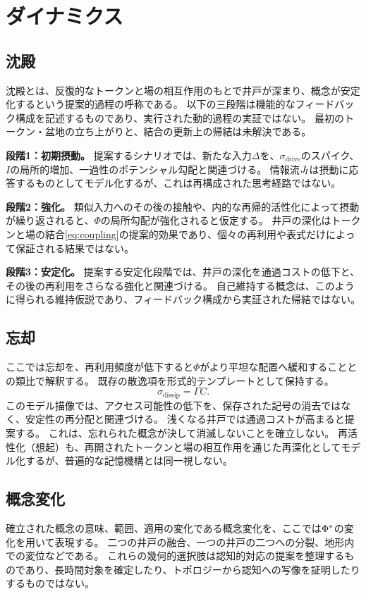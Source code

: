 \section{ダイナミクス}
\label{sec:dynamics}

\subsection{沈殿}
沈殿とは、反復的なトークンと場の相互作用のもとで井戸が深まり、概念が安定化するという提案的過程の呼称である。
以下の三段階は機能的なフィードバック構成を記述するものであり、実行された動的過程の実証ではない。
最初のトークン・盆地の立ち上がりと、結合の更新上の帰結は未解決である。

\textbf{段階1：初期摂動。}
提案するシナリオでは、新たな入力$\Delta$を、$\sigma_{\mathrm{drive}}$のスパイク、$I$の局所的増加、一過性のポテンシャル勾配と関連づける。
情報流$J_{\!I}$は摂動に応答するものとしてモデル化するが、これは再構成された思考経路ではない。

\textbf{段階2：強化。}
類似入力へのその後の接触や、内的な再帰的活性化によって摂動が繰り返されると、$\Phi$の局所勾配が強化されると仮定する。
井戸の深化はトークンと場の結合\eqref{eq:coupling}の提案的効果であり、個々の再利用や表式だけによって保証される結果ではない。

\textbf{段階3：安定化。}
提案する安定化段階では、井戸の深化を通過コストの低下と、その後の再利用をさらなる強化と関連づける。
自己維持する概念は、このように得られる維持仮説であり、フィードバック構成から実証された帰結ではない。

\subsection{忘却}
ここでは忘却を、再利用頻度が低下すると$\Phi$がより平坦な配置へ緩和することとの類比で解釈する。
既存の散逸項を形式的テンプレートとして保持する。
\begin{equation}
  \sigma_{\mathrm{dissip}} = \Gamma C.
\end{equation}
このモデル描像では、アクセス可能性の低下を、保存された記号の消去ではなく、安定性の再分配と関連づける。
浅くなる井戸では通過コストが高まると提案する。
これは、忘れられた概念が決して消滅しないことを確立しない。
再活性化（想起）も、再開されたトークンと場の相互作用を通じた再深化としてモデル化するが、普遍的な記憶機構とは同一視しない。

\subsection{概念変化}
確立された概念の意味、範囲、適用の変化である概念変化を、ここでは$\Phi^{*}$の変化を用いて表現する。
二つの井戸の融合、一つの井戸の二つへの分裂、地形内での変位などである。
これらの幾何的選択肢は認知的対応の提案を整理するものであり、長時間対象を確定したり、トポロジーから認知への写像を証明したりするものではない。

